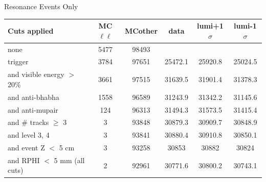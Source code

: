 \documentclass[landscape]{article}
\begin{document}
\begin{center}
{\sc Resonance Events Only} \\
\vspace{0.2 cm}

\begin{tabular}{l c c c c c}
\hline\hline Cuts applied & MC$\ell\ell$ & MCother & data & lumi+1$\sigma$ & lumi-1$\sigma$ \\\hline

 none & 5477 & 98493 \\
 trigger & 3784 & 97651 & 25472.1 & 25920.8 & 25024.5 \\
 {\sc and} visible energy $>$ 20\% & 3661 & 97515 & 31639.5 & 31901.4 & 31378.3 \\
 {\sc and} anti-bhabha & 1558 & 96589 & 31243.9 & 31342.2 & 31145.6 \\
 {\sc and} anti-mupair & 124 & 96313 & 31494.3 & 31573.5 & 31415.4 \\
 {\sc and} \# tracks $\ge$ 3 & 3 & 93848 & 30879.3 & 30909.7 & 30848.9 \\
 {\sc and} level 3, 4 & 3 & 93841 & 30880.4 & 30910.8 & 30850.1 \\
 {\sc and} event Z $<$ 5 cm & 3 & 93258 & 30853 & 30882 & 30824 \\
 {\sc and} RPHI $<$ 5 mm (all cuts) & 2 & 92961 & 30771.6 & 30800.2 & 30743.1 \\\hline\hline

\end{tabular}
\end{center}
 
\vfill
\end{document}
